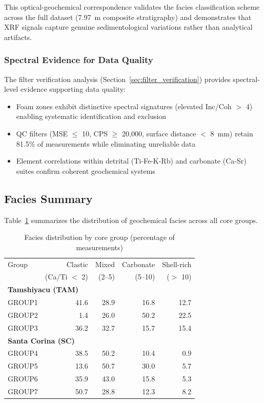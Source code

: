 \documentclass[11pt,a4paper]{article}
\newcommand{\CaTi}{Ca/Ti}  %
\begin{document}
This optical-geochemical correspondence validates the facies classification scheme across the full dataset (7.97~m composite stratigraphy) and demonstrates that XRF signals capture genuine sedimentological variations rather than analytical artifacts.

\subsubsection{Spectral Evidence for Data Quality}

The filter verification analysis (Section~\ref{sec:filter_verification}) provides spectral-level evidence supporting data quality:

\begin{itemize}
    \item Foam zones exhibit distinctive spectral signatures (elevated Inc/Coh $>$ 4) enabling systematic identification and exclusion
    \item QC filters (MSE $\leq$ 10, CPS $\geq$ 20,000, surface distance $<$ 8~mm) retain 81.5\% of measurements while eliminating unreliable data
    \item Element correlations within detrital (Ti-Fe-K-Rb) and carbonate (Ca-Sr) suites confirm coherent geochemical systems
\end{itemize}

\subsection{Facies Summary}

Table~\ref{tab:facies_summary} summarizes the distribution of geochemical facies across all core groups.

\begin{table}[h]
\centering
\caption{Facies distribution by core group (percentage of measurements)}
\label{tab:facies_summary}
\begin{tabular}{lrrrr}
\toprule
Group & Clastic & Mixed & Carbonate & Shell-rich \\
      & (\CaTi{} $<$ 2) & (2--5) & (5--10) & ($>$ 10) \\
\midrule
\multicolumn{5}{l}{\textbf{Tamshiyacu (TAM)}} \\
GROUP1 & 41.6 & 28.9 & 16.8 & 12.7 \\
GROUP2 & 1.4 & 26.0 & 50.2 & 22.5 \\
GROUP3 & 36.2 & 32.7 & 15.7 & 15.4 \\
\midrule
\multicolumn{5}{l}{\textbf{Santa Corina (SC)}} \\
GROUP4 & 38.5 & 50.2 & 10.4 & 0.9 \\
GROUP5 & 13.6 & 50.7 & 30.0 & 5.7 \\
GROUP6 & 35.9 & 43.0 & 15.8 & 5.3 \\
GROUP7 & 50.7 & 28.8 & 12.3 & 8.2 \\
\bottomrule
\end{tabular}
\end{table}
\end{document}
